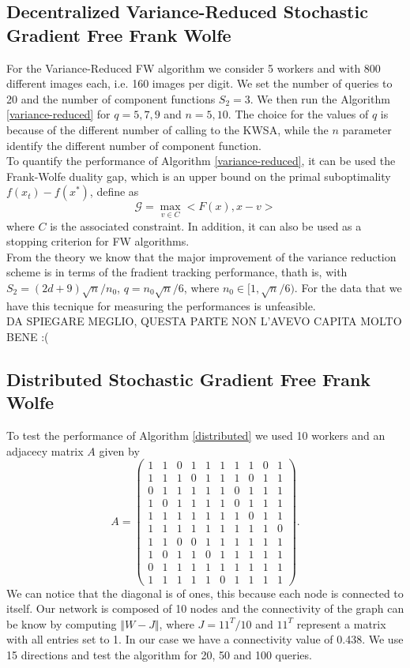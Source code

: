 \subsection{Decentralized Variance-Reduced Stochastic Gradient Free Frank Wolfe}
For the Variance-Reduced FW algorithm we consider 5 workers and with 800 different images each, i.e. 160 images per digit. We set the number of queries to 20 and the number of component functions $S_2 = 3$. We then run the Algorithm \ref{variance-reduced} for $q=5,7,9$ and $n=5,10$. The choice for the values of $q$ is because of the different number of calling to the KWSA, while the $n$ parameter identify the different number of component function.\\
To quantify the performance of Algorithm \ref{variance-reduced}, it can be used the Frank-Wolfe duality gap, which is an upper bound on the primal suboptimality $f(x_t)-f(x^*)$, define as
\[ \mathcal{G} = \max_{v \in C} <F(x),x-v> \]
where $C$ is the associated constraint. In addition, it can also be used as a stopping criterion for FW algorithms.\\
From the theory we know that the major improvement of the variance reduction scheme is in terms of the fradient tracking performance, thath is, with $S_2 = (2d+9)\sqrt{n}/n_0$, $q = n_0 \sqrt{n}/6$, where $n_0 \in [1, \sqrt{n}/6)$. For the data that we have this tecnique for measuring the performances is unfeasible.\\

DA SPIEGARE MEGLIO, QUESTA PARTE NON L'AVEVO CAPITA MOLTO BENE :(

\subsection{Distributed Stochastic Gradient Free Frank Wolfe}
To test the performance of Algorithm \ref{distributed} we used 10 workers and an adjacecy matrix $A$ given by 
\[ A = 
\begin{pmatrix}
1& 1& 0& 1& 1& 1& 1& 1& 0& 1\\
1& 1& 1& 0& 1& 1& 1& 0& 1& 1\\
0& 1& 1& 1& 1& 1& 0& 1& 1& 1\\
1& 0& 1& 1& 1& 1& 0& 1& 1& 1\\
1& 1& 1& 1& 1& 1& 1& 0& 1& 1\\
1& 1& 1& 1& 1& 1& 1& 1& 1& 0\\
1& 1& 0& 0& 1& 1& 1& 1& 1& 1\\
1& 0& 1& 1& 0& 1& 1& 1& 1& 1\\
0& 1& 1& 1& 1& 1& 1& 1& 1& 1\\
1& 1& 1& 1& 1& 0& 1& 1& 1& 1	
\end{pmatrix}
.\]
We can notice that the diagonal is of ones, this because each node is connected to itself. Our network is composed of 10 nodes and the connectivity of the graph can be know by computing $\Vert W- J \Vert$, where $J= 11^T/10$ and $11^T$ represent a matrix with all entries set to 1. In our case we have a connectivity value of 0.438. We use 15 directions and test the algorithm for 20, 50 and 100 queries.

